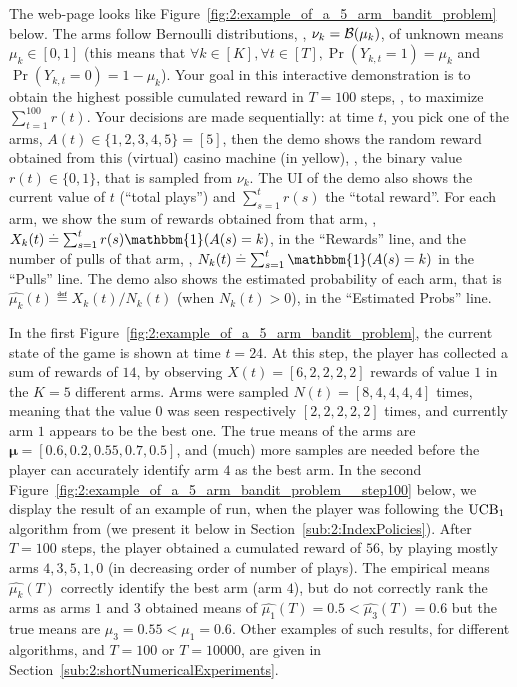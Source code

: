 The web-page looks like Figure~\ref{fig:2:example_of_a_5_arm_bandit_problem} below.
The arms follow Bernoulli distributions, \ie, $\nu_k = \mathcal{B}(\mu_k)$, of unknown means $\mu_k\in[0,1]$ (this means that $\forall k\in[K], \forall t\in[T], \Pr(Y_{k,t} = 1) = \mu_k$ and $\Pr(Y_{k,t} = 0) = 1 - \mu_k$).
Your goal in this interactive demonstration is to obtain the highest possible cumulated reward in $T=100$ steps, \ie, to maximize $\sum_{t=1}^{100} r(t)$.
Your decisions are made sequentially: at time $t$, you pick one of the arms, $A(t) \in\{1,2,3,4,5\}=[5]$, then the demo shows the random reward obtained from this (virtual) casino machine (in \textcolor{deepgold}{yellow}), \ie, the binary value $r(t)\in\{0,1\}$, that is sampled \iid{} from $\nu_k$.
%
The UI of the demo also shows the current value of $t$ (``total plays'') and $\sum_{s=1}^t r(s)$ the ``total reward''.
For each arm, we show the sum of rewards obtained from that arm, \ie, $X_k(t) \eqdef \sum_{s=1}^t r(s) \mathbbm{1}(A(s) = k)$, in the ``Rewards'' line, and the number of pulls of that arm, \ie, $N_k(t) \eqdef \sum_{s=1}^t \mathbbm{1}(A(s) = k)$ in the ``Pulls'' line.
%
The demo also shows the estimated probability of each arm, that is $\widehat{\mu_k}(t) \eqdef X_k(t) / N_k(t)$ (when $N_k(t)>0$), in the ``Estimated Probs'' line.

In the first Figure~\ref{fig:2:example_of_a_5_arm_bandit_problem}, the current state of the game is shown at time $t=24$.
At this step, the player has collected a sum of rewards of $14$, by observing $X(t) = [6,2,2,2,2]$ rewards of value $1$ in the $K=5$ different arms. Arms were sampled $N(t) = [8,4,4,4,4]$ times, meaning that the value $0$ was seen respectively $[2,2,2,2,2]$ times, and currently arm $1$ appears to be the best one. The true means of the arms are $\bm{\mu}=[0.6, 0.2, 0.55, 0.7, 0.5]$, and (much) more samples are needed before the player can accurately identify arm $4$ as the best arm.
%
In the second Figure~\ref{fig:2:example_of_a_5_arm_bandit_problem__step100} below, we display the result of an example of run, when the player was following the $\mathrm{UCB}_1$ algorithm from \cite{Auer02} (we present it below in Section~\ref{sub:2:IndexPolicies}).
After $T=100$ steps, the player obtained a cumulated reward of $56$, by playing mostly arms $4,3,5,1,0$ (in decreasing order of number of plays). The empirical means $\widehat{\mu_k}(T)$ correctly identify the best arm (arm $4$), but do not correctly rank the arms as arms $1$ and $3$ obtained means of $\widehat{\mu_1}(T) = 0.5 < \widehat{\mu_3}(T)=0.6$ but the true means are $\mu_3 = 0.55 < \mu_1 = 0.6$.
Other examples of such results, for different algorithms, and $T=100$ or $T=10000$, are given in Section~\ref{sub:2:shortNumericalExperiments}.

